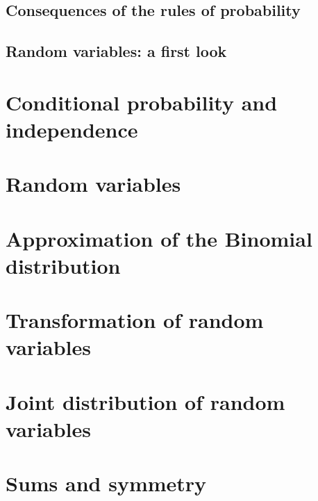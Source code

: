   \subsection{Consequences of the rules of probability}
  \label{subsec:1.4}

  \subsection{Random variables: a first look}
  \label{subsec:1.5}



\section{Conditional probability and independence}
\label{sec:cond-prob-indep}


\section{Random variables}
\label{sec:random-variables}


\section{Approximation of the Binomial distribution}
\label{sec:appr-binom-distr}


\section{Transformation of random variables}
\label{sec:transf-rand-vari}


\section{Joint distribution of random variables}
\label{sec:joint-distr-rand}


\section{Sums and symmetry}
\label{sec:sums-symmetry}

